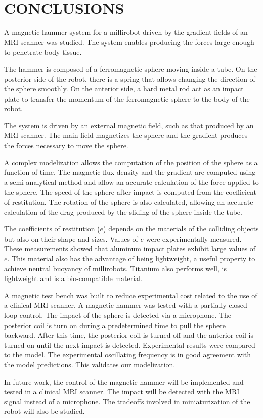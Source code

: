 \documentclass[letterpaper, 10 pt, conference]{ieeeconf}  %
\begin{document}
\section{CONCLUSIONS}
\label{conclusion}
A magnetic hammer system for a millirobot driven by the gradient fields of an MRI scanner was studied. 
The system enables producing the forces large enough to penetrate body tissue.\par
The hammer is composed of a ferromagnetic sphere moving inside a tube. 
On the posterior side of the robot, there is a spring that allows changing the direction of the sphere smoothly. 
On the anterior side, a hard metal rod act as an impact plate to transfer the momentum of the ferromagnetic sphere to the body of the robot.\par
The system is driven by an external magnetic field, such as that produced by an MRI scanner. 
The main field magnetizes the sphere and the gradient produces the forces necessary to move the sphere.\par
 A complex modelization allows the computation of the position of the sphere as a function of time. 
 The magnetic flux density and the gradient are computed using a semi-analytical method and allow an accurate calculation of the force applied to the sphere. 
 The speed of the sphere after impact is computed from the coefficient of restitution. 
 The rotation of the sphere is also calculated, allowing an accurate calculation of the drag produced by the sliding of the sphere inside the tube.\par
The coefficients of restitution ($e$) depends on the materials of the colliding objects but also on their shape and sizes. 
Values of $e$ were experimentally measured. 
These measurements showed that aluminum impact plates exhibit large values of $e$. 
This material also has the advantage of being lightweight, a useful property to achieve neutral buoyancy of millirobots. 
Titanium also performs well, is lightweight and is a bio-compatible material.\par
A magnetic test bench was built to reduce experimental cost related to the use of a clinical MRI scanner. 
A magnetic hammer was tested with a partially closed loop control. 
The impact of the sphere is detected via a microphone. 
The posterior coil is turn on during a predetermined time to pull the sphere backward.
 After this time, the posterior coil is turned off and the anterior coil is turned on until the next impact is detected. 
 Experimental results were compared to the model.
  The experimental oscillating frequency is in good agreement with the model predictions. 
  This validates our modelization.\par
In future work, the control of the magnetic hammer will be implemented and tested in a clinical MRI scanner. 
The impact will be detected with the MRI signal instead of a microphone. 
The tradeoffs involved in miniaturization of the robot will also be studied.
\end{document}
